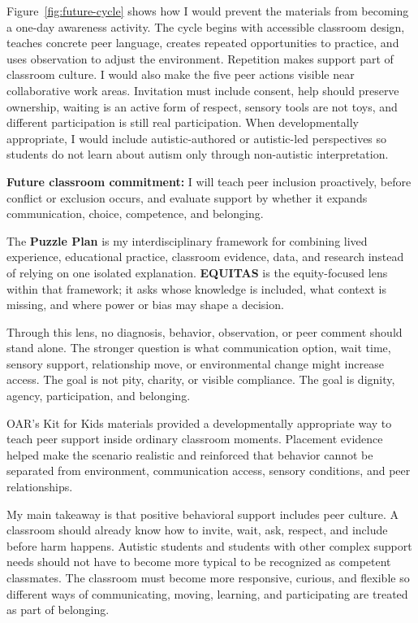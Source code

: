 Figure~\ref{fig:future-cycle} shows how I would prevent the materials from becoming a one-day awareness activity. The cycle begins with accessible classroom design, teaches concrete peer language, creates repeated opportunities to practice, and uses observation to adjust the environment. Repetition makes support part of classroom culture. I would also make the five peer actions visible near collaborative work areas. Invitation must include consent, help should preserve ownership, waiting is an active form of respect, sensory tools are not toys, and different participation is still real participation. When developmentally appropriate, I would include autistic-authored or autistic-led perspectives so students do not learn about autism only through non-autistic interpretation.

\begin{center}
\colorbox{SoftGreen}{\parbox{0.92\textwidth}{\textbf{Future classroom commitment:} I will teach peer inclusion proactively, before conflict or exclusion occurs, and evaluate support by whether it expands communication, choice, competence, and belonging.}}
\end{center}

{}

The \textbf{Puzzle Plan} is my interdisciplinary framework for combining lived experience, educational practice, classroom evidence, data, and research instead of relying on one isolated explanation. \textbf{EQUITAS} is the equity-focused lens within that framework; it asks whose knowledge is included, what context is missing, and where power or bias may shape a decision.

Through this lens, no diagnosis, behavior, observation, or peer comment should stand alone. The stronger question is what communication option, wait time, sensory support, relationship move, or environmental change might increase access. The goal is not pity, charity, or visible compliance. The goal is dignity, agency, participation, and belonging.



OAR's Kit for Kids materials provided a developmentally appropriate way to teach peer support inside ordinary classroom moments. Placement evidence helped make the scenario realistic and reinforced that behavior cannot be separated from environment, communication access, sensory conditions, and peer relationships.

My main takeaway is that positive behavioral support includes peer culture. A classroom should already know how to invite, wait, ask, respect, and include before harm happens. Autistic students and students with other complex support needs should not have to become more typical to be recognized as competent classmates. The classroom must become more responsive, curious, and flexible so different ways of communicating, moving, learning, and participating are treated as part of belonging.
